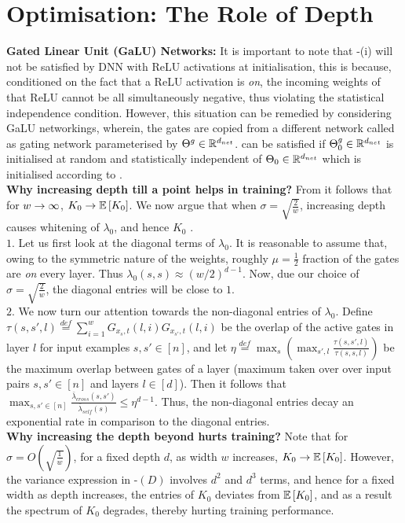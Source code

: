 \section{Optimisation: The Role of Depth}\label{sec:optimisation}
\textbf{Gated Linear Unit (GaLU) Networks:} It is important to note that -(i) will not be satisfied by DNN with ReLU activations at initialisation, this is because, conditioned on the fact that a ReLU activation is \emph{on}, the incoming weights of that ReLU cannot be all simultaneously negative, thus violating the statistical independence condition. However, this situation can be remedied by considering GaLU networkings, wherein, the gates are copied from a different network called as gating network parameterised by ${\Theta}^g\in\mathbb{R}^{d_{net}}$.  can be satisfied if ${\Theta}^g_0\in \mathbb{R}^{d_{net}}$ is initialised at random and statistically independent of $\Theta_0\in \mathbb{R}^{d_{net}}$ which is initialised according to .\hfill\\
\textbf{Why increasing depth till a point helps in training? }From  it follows that for $w\rightarrow\infty$, $K_0\rightarrow\mathbb{E}\left[K_0\right]$. We now argue that when $\sigma=\sqrt{\frac{2}{w}}$, increasing depth causes whitening of $\lambda_0$, and hence $K_0$ .\hfill\\
$1.$ Let us first look at the diagonal terms of $\lambda_0$. It is reasonable to assume that, owing to the symmetric nature of the weights, roughly $\mu=\frac{1}{2}$ fraction of the gates are \emph{on} every layer. Thus $\lambda_0(s,s)\approx (w/2)^{d-1}$. Now, due our choice of $\sigma=\sqrt{\frac{2}{w}}$, the diagonal entries will be close to $1$.\hfill\\
$2.$ We now turn our attention towards the non-diagonal entries of $\lambda_0$. Define $\tau(s,s',l)\stackrel{def}=\sum_{i=1}^w G_{x_s,t}(l,i)G_{x_{s'},t}(l,i)$ be the overlap of the active gates in layer $l$ for input examples $s,s'\in[n]$, and  let $\eta\stackrel{def}=\max_s\left(\max_{s',l} \frac{\tau(s,s',l)}{\tau(s,s,l)}\right)$ be the maximum overlap between gates of a layer (maximum taken over over input pairs $s,s'\in[n]$ and layers $l\in [d]$).  Then it follows that $\max_{s,s'\in [n]} \frac{\bar{\lambda}_{cross}(s,s')}{\bar{\lambda}_{self}(s)}\leq \eta^{d-1}$. Thus, the non-diagonal entries decay an exponential rate in comparison to the diagonal entries.\hfill\\
\textbf{Why increasing the depth beyond hurts training?} Note that for $\sigma=O\left(\sqrt{\frac{1}{w}}\right)$, for a fixed depth $d$, as width $w$ increases, $K_0\rightarrow\mathbb{E}\left[K_0\right]$. However, the variance expression in -$(D)$ involves $d^2$ and $d^3$ terms, and hence for a fixed width as depth increases, the entries of $K_0$ deviates from $\mathbb{E}\left[K_0\right]$, and as a result the spectrum of $K_0$ degrades, thereby hurting training performance.

